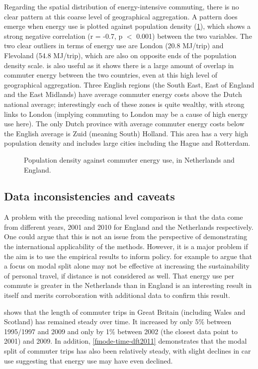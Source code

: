 Regarding the spatial distribution of energy-intensive commuting,
there is no clear pattern at this coarse level of geographical aggregation.
A pattern does emerge when energy use is plotted against
population density (\cref{fepdensnl}), which shows a strong negative correlation
(r = -0.7, p $<$ 0.001) between the two variables. The two clear outliers in
terms of energy use are London (20.8 MJ/trip) and Flevoland (54.8 MJ/trip),
which are also on opposite ends of the population density scale.
 is also useful as it shows there is a large amount of
overlap in commuter energy between the two countries, even at this high
level of geographical aggregation. Three English regions
(the South East, East of England and the East Midlands) have average
commuter energy costs above the Dutch national average; interestingly
each of these zones is quite wealthy, with strong links to London
(implying commuting to London may be a cause of high energy use here).
The only Dutch province with average commuter energy costs below the
English average is Zuid (meaning South) Holland. This area has a very high
population density and includes large cities including the Hague and
Rotterdam.

\begin{figure}
 \caption[Population density against commuter energy use]
 {Population density against commuter energy use, in Netherlands and England.}
 \label{fepdensnl}
\end{figure}

\subsection{Data inconsistencies and caveats}
A problem with the preceding national level comparison is that the
data come from different years, 2001 and 2010 for England and the Netherlands
respectively. One could argue that this is not an issue
from the perspective of demonstrating the international applicability of the
methods. However, it is a major problem if the aim is to use the empirical results
to inform policy.
for example to argue that a focus on modal split alone may not be  effective at
increasing the sustainability of personal travel, if distance is not considered
as well. %
That energy use per commute is greater in the Netherlands
than in England is an interesting result in itself and merits
corroboration with additional data to confirm this result.

 shows that the length of commuter trips in Great
Britain (including Wales and Scotland) has remained steady over
time. It increased by only 5\% between 1995/1997 and 2009 and only by
1\% between 2002 (the closest data point to 2001) and 2009. In addition,
\cref{fmode-time-dft2011} demonstrates that the modal split of commuter trips
has also been relatively steady, with slight declines in car use suggesting that
energy use may have even declined. 

